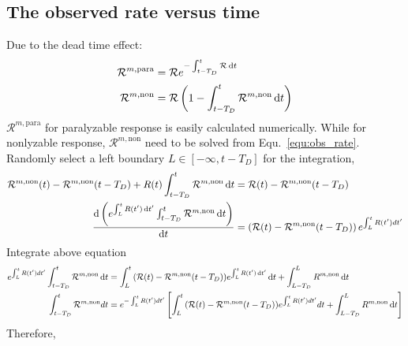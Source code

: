 \subsection{The observed rate versus time}
Due to the dead time effect:
\begin{equation}
\begin{aligned}
\mathcal{R}^{m,\mathrm{para}}&=\mathcal{R}e^{-\int_{t-T_D}^t{\mathcal{R}\mathop{}\!\mathrm{d} t}}\\
\mathcal{R}^{m,\mathrm{non}}&=\mathcal{R}\left(1-\int_{t-T_D}^t{\mathcal{R}^{m,\mathrm{non}}\mathop{}\!\mathrm{d} t}\right)
\end{aligned}
\label{equ:obs_rate}
\end{equation}
$\mathcal{R}^{m,\mathrm{para}}$ for paralyzable response is easily calculated numerically. While for nonlyzable response, $\mathcal{R}^{m,\mathrm{non}}$ need to be solved from Equ.~\eqref{equ:obs_rate}. 
Randomly select a left boundary $L\in[-\infty,t-T_D]$ for the integration,
\begin{equation}
\begin{aligned}
\mathcal{R}^{m,\mathrm{non}}(t)-\mathcal{R}^{m,\mathrm{non}}(t-T_D)+R(t)\int_{t-T_D}^t{\mathcal{R}^{m,\mathrm{non}}\mathop{}\!\mathrm{d} t}&=\mathcal{R}(t)-\mathcal{R}^{m,\mathrm{non}}(t-T_D)\\
\frac{\mathop{}\!\mathrm{d} \left(e^{\int_{L}^{t}{R(t')\mathop{}\!\mathrm{d} t'}}\int_{t-T_D}^t{\mathcal{R}^{m,\mathrm{non}}\mathop{}\!\mathrm{d} t}\right)}{\mathop{}\!\mathrm{d} t}&=\left(\mathcal{R}(t)-\mathcal{R}^{m,\mathrm{non}}(t-T_D)\right)e^{\int_{L}^{t}{R(t')dt'}}
\end{aligned}
\end{equation}
Integrate above equation
\begin{equation}
\begin{aligned}
e^{\int_{L}^{t}{R(t')dt'}}\int_{t-T_D}^t{\mathcal{R}^{m,\mathrm{non}}\mathop{}\!\mathrm{d} t}&=\int_{L}^{t}{(\mathcal{R}(t)-\mathcal{R}^{m,\mathrm{non}}(t-T_D))e^{\int_{L}^{t}{R(t')\mathop{}\!\mathrm{d} t'}}\mathop{}\!\mathrm{d} t} + \int_{L-T_D}^{L}{R^{m,\mathrm{non}}\mathop{}\!\mathrm{d} t}\\
\int_{t-T_D}^t{\mathcal{R}^{m,\mathrm{non}}dt}&=e^{-\int_{L}^{t}{R(t')dt'}}\left[\int_{L}^{t}{(\mathcal{R}(t)-\mathcal{R}^{m,\mathrm{non}}(t-T_D))e^{\int_{L}^{t}{R(t')dt'}}dt} + \int_{L-T_D}^{L}{R^{m,\mathrm{non}}\mathop{}\!\mathrm{d} t}\right]
\label{equ:nonpara_integration}
\end{aligned}
\end{equation}
Therefore, 
